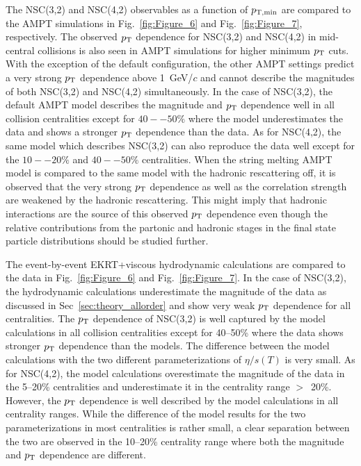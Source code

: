 The NSC(3,2) and NSC(4,2) observables as a function of $p_{\rm T, min}$ are compared to the {AMPT} simulations in Fig.~\ref{fig:Figure_6} and Fig.~\ref{fig:Figure_7}, respectively.
The observed $p_{\rm T}$ dependence for NSC(3,2) and NSC(4,2) in mid-central collisions is also seen in AMPT simulations for higher minimum $p_{\rm T}$ cuts.
With the exception of the default configuration, the other AMPT settings predict a very strong $p_{\rm T}$ dependence above 1~GeV/$c$ and cannot describe the magnitudes of both NSC(3,2) and NSC(4,2) simultaneously.
In the case of NSC(3,2), the default AMPT model describes the magnitude and $p_{\rm T}$ dependence well in all collision centralities except for $40--50\%$ where the model underestimates the data and shows a stronger $p_{\rm T}$ dependence than the data.
As for  NSC(4,2), the same model which describes NSC(3,2) can also reproduce the data well except for the $10--20\%$ and $40--50\%$ centralities.
When the string melting AMPT model is compared to the same model with the hadronic rescattering off, it is observed that the very strong $p_{\rm T}$ dependence as well as the correlation strength are weakened by the hadronic rescattering.
This might imply that hadronic interactions are the source of this observed $p_{\rm T}$ dependence even though the relative contributions from the partonic and hadronic stages in the final state particle distributions should be studied further.

The event-by-event EKRT+viscous hydrodynamic calculations are compared to the data in Fig.~\ref{fig:Figure_6} and Fig.~\ref{fig:Figure_7}.
In the case of NSC(3,2), the hydrodynamic calculations underestimate the magnitude of the data as discussed in Sec~\ref{sec:theory_allorder} and show very weak $p_{\rm T}$ dependence for all centralities.
The $p_{\rm T}$ dependence of NSC(3,2) is well captured by the model calculations in all collision centralities except for 40--50\% where the data shows stronger $p_{\rm T}$ dependence than the models. The difference between the model calculations with the two different parameterizations of $\eta/s(T)$ is very small. 
As for NSC(4,2), the model calculations overestimate the magnitude of the data in the 5--20\% centralities and underestimate it in the centrality range $>$~20\%. However, the $p_{\rm T}$ dependence is well described by the model calculations in all centrality ranges. 
While the difference of the model results for the two parameterizations in most centralities is rather small, a clear separation between the two are observed in the 10--20\% centrality range where both the magnitude and $p_{\rm T}$ dependence are different.

